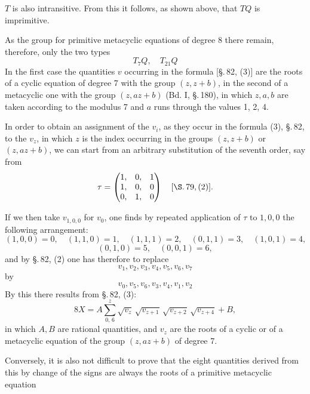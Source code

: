 $T$ is also intransitive. From this it follows, as shown above, that $TQ$
is imprimitive.

As the group for primitive metacyclic equations of degree 8
there remain, therefore, only the two types
\[
T_7 Q, \quad T_{21} Q
\]
In the first case the quantities $v$ occurring in the formula [\S.\,82, (3)]
are the roots of a cyclic equation of degree 7
with the group $(z, z+b)$, in the second of a metacyclic one with the
group $(z, az+b)$ (Bd. I, \S.\,180), in which $z, a, b$ are taken according to the modulus 7
and $a$ runs through the values 1, 2, 4.

In order to obtain an assignment of the $v_i$, as they occur in the formula (3), \S.\,82,
to the $v_z$, in which $z$ is the index occurring in the groups $(z, z+b)$ or $(z, az+b)$,
we can start from an arbitrary
substitution of the seventh order, say from
\[
\tau = \begin{pmatrix} 1, & 0, & 1 \\ 1, & 0, & 0 \\ 0, & 1, & 0 \end{pmatrix}
\quad [\S.\,79, (2)].
\]

If we then take $v_{1,0,0}$ for $v_0$, one finds by repeated
application of $\tau$ to $1, 0, 0$ the following arrangement:
\[
(1,0,0)=0, \quad (1,1,0)=1, \quad (1,1,1)=2, \quad (0,1,1)=3, \quad (1,0,1)=4,
\]
\[
(0,1,0)=5, \quad (0,0,1)=6,
\]
and by \S.\,82, (2) one has therefore to replace
\[
v_1, v_2, v_3, v_4, v_5, v_6, v_7
\]
by
\[
v_0, v_5, v_6, v_3, v_4, v_1, v_2
\]
By this there results from \S.\,82, (3):
\[
8X = A \sum_{0,\,6}^{z} \sqrt{v_z}\,\sqrt{v_{z+1}}\,\sqrt{v_{z+2}}\,\sqrt{v_{z+4}} + B,
\]
in which $A, B$ are rational quantities, and $v_z$ are the roots of a cyclic or
of a metacyclic equation of the group $(z, az+b)$ of degree 7.

Conversely, it is also not difficult to prove that the eight quantities
derived from this by change of the signs are always the roots
of a primitive metacyclic equation
